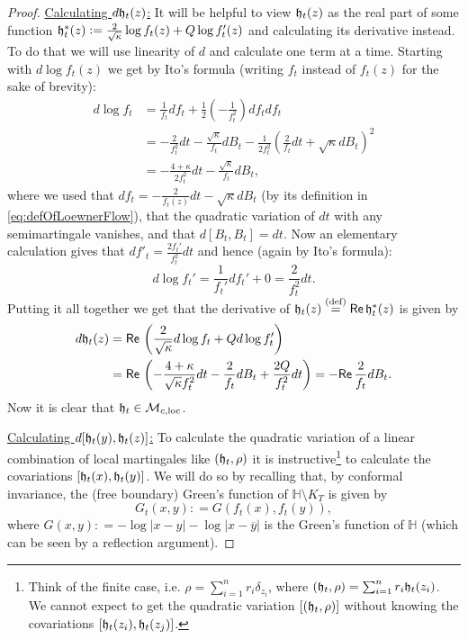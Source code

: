 \documentclass[11pt,reqno]{amsart}
\numberwithin{equation}{section}
\newcommand{\eqbydef}{\mathrel{\stackrel{\text{(def)}}{=}}}
\newcommand{\deq}{\mathrel{\mathop:}=}
\renewcommand{\Re}{\mathsf{Re}\,}
\newcommand{\fh}{{\frak h}}
\begin{document}
\begin{proof}
	\underline{Calculating $d\fh_t(z)$:} It will be helpful to view $\fh_t(z)$ as the real part of some function $\fh_t^*(z)\deq \frac{2}{\sqrt\kappa}\log f_t(z)+Q\log f_t'(z)$ and calculating its derivative instead. To do that we will use linearity of $d$ and calculate one term at a time. Starting with $d\log f_t(z)$ we get by Ito's formula (writing $f_t$ instead of $f_t(z)$ for the sake of brevity):
	\begin{align*}
		d\log f_t &=\frac{1}{f_t}df_t+\frac{1}{2}\left(-\frac{1}{f_t^2}\right)df_tdf_t\\
		&=-\frac{2}{f_t^2}dt-\frac{\sqrt\kappa}{f_t}dB_t-\frac{1}{2f_t^2}\left(\frac{2}{f_t}dt+\sqrt\kappa dB_t\right)^2\\
		&=-\frac{4+\kappa}{2f_t^2}dt-\frac{\sqrt\kappa}{f_t}dB_t,
	\end{align*}
	where we used that $df_t=-\frac{2}{f_t(z)}dt-\sqrt\kappa dB_t$ (by its definition in \eqref{eq:defOfLoewnerFlow}), that the quadratic variation of $dt$ with any semimartingale vanishes, and that $d[B_t,B_t]=dt$.
	Now an elementary calculation gives that $df'_t=\frac{2f_t'}{f_t^2}dt$ and hence (again by Ito's formula):
	$$d\log f_t'=\frac{1}{f_t'}df_t'+0=\frac{2}{f_t^2}dt.$$
	Putting it all together we get that the derivative of $\fh_t(z)\eqbydef\Re\fh_t^*(z)$ is given by 
	\begin{align*}
		d\fh_t(z)&=\Re\left(\frac{2}{\sqrt\kappa}d\log f_t+Qd\log f_t' \right)\\
		&=\Re\left(-\frac{4+\kappa}{\sqrt\kappa f_t^2}dt-\frac{2}{f_t}dB_t+\frac{2Q}{f_t^2}dt\right)=-\Re\frac{2}{f_t}dB_t.
	\end{align*}
	Now it is clear that $\fh_t\in\mathcal M_{c,\text{loc}}$.
	
	\underline{Calculating $d[\fh_t(y),\fh_t(z)]$:} To calculate the quadratic variation of a linear combination of local martingales like $(\fh_t,\rho)$ it is instructive\footnote{Think of the finite case, i.e. $\rho = \sum_{i=1}^n r_i\delta_{z_i}$, where $(\fh_t,\rho) = \sum_{i=1}^n r_i\fh_t(z_i)$. We cannot expect to get the quadratic variation $[(\fh_t,\rho)]$ without knowing the covariations $[\fh_t(z_i),\fh_t(z_j)]$.} to calculate the covariations $[\fh_t(x),\fh_t(y)]$. We will do so by recalling that, by conformal invariance, the (free boundary) Green's function of $\mathbb H\setminus K_T$ is given by $$G_t(x,y)\deq G(f_t(x),f_t(y)),$$
	where $G(x,y)\deq -\log|x-y|-\log|x-\overline y|$ is the Green's function of $\mathbb H$ (which can be seen by a reflection argument).
	

\end{proof}
\end{document}
